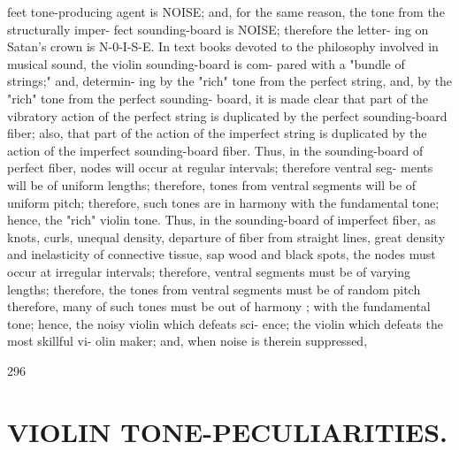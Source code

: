 feet tone-producing agent is NOISE; and, for the same reason, the tone from the structurally imper- fect sounding-board is NOISE; therefore the letter- ing on Satan's crown is N-0-I-S-E. In text books devoted to the philosophy involved in musical sound, the violin sounding-board is com- pared with a "bundle of strings;" and, determin- ing by the "rich" tone from the perfect string, and, by the "rich" tone from the perfect sounding- board, it is made clear that part of the vibratory action of the perfect string is duplicated by the perfect sounding-board fiber; also, that part of the action of the imperfect string is duplicated by the action of the imperfect sounding-board fiber. Thus, in the sounding-board of perfect fiber, nodes will occur at regular intervals; therefore ventral seg- ments will be of uniform lengths; therefore, tones from ventral segments will be of uniform pitch; therefore, such tones are in harmony with the fundamental tone; hence, the "rich" violin tone. Thus, in the sounding-board of imperfect fiber, as knots, curls, unequal density, departure of fiber from straight lines, great density and inelasticity of connective tissue, sap wood and black spots, the nodes must occur at irregular intervals; therefore, ventral segments must be of varying lengths; therefore, the tones from ventral segments must be of random pitch therefore, many of such tones must be out of harmony ; with the fundamental tone; hence, the noisy violin which defeats sci- ence; the violin which defeats the most skillful vi- olin maker; and, when noise is therein suppressed,

296

\section{VIOLIN TONE-PECULIARITIES.}

